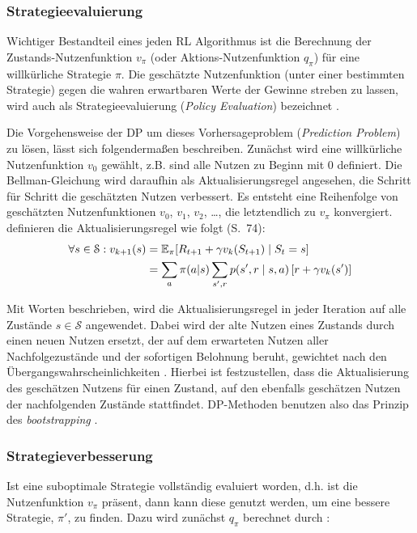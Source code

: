 \subsubsection{Strategieevaluierung}\label{sec:evaluierung}
Wichtiger Bestandteil eines jeden RL Algorithmus ist die Berechnung der Zustands-Nutzenfunktion $v_\pi$ (oder Aktions-Nutzenfunktion $q_\pi$) für eine willkürliche Strategie $\pi$. Die geschätzte Nutzenfunktion (unter einer bestimmten Strategie) gegen die wahren erwartbaren Werte der Gewinne streben zu lassen, wird auch als Strategieevaluierung (\textit{Policy Evaluation}) bezeichnet \cite[S.~74]{Sutton1998}.
\par 
Die Vorgehensweise der DP um dieses Vorhersageproblem (\textit{Prediction Problem}) zu lösen, lässt sich folgendermaßen beschreiben. Zunächst wird eine willkürliche Nutzenfunktion $v_0$ gewählt, z.B. sind alle Nutzen zu Beginn mit 0 definiert. Die Bellman-Gleichung wird daraufhin als Aktualisierungsregel angesehen, die Schritt für Schritt die geschätzten Nutzen verbessert. Es entsteht eine Reihenfolge von geschätzten Nutzenfunktionen $v_0$, $v_1$, $v_2$, \dots, die letztendlich zu $v_\pi$ konvergiert. \cite{Sutton1998} definieren die Aktualisierungsregel wie folgt (S.~74):
\begin{equation}\label{eq:fullbackup}
    \begin{aligned}
        \forall s \in \mathcal{S}: v_{k+1}(s) &= \operatorname{\mathbb{E}}_{\pi}[ R_{t+1} + \gamma v_k(S_{t+1}) \mid S_t = s] \\
        &= \sum_a{\pi(a|s) \sum_{s',r}p(s',r\mid s, a) \left[r+\gamma v_k(s')\right]}
    \end{aligned}
\end{equation}

Mit Worten beschrieben, wird die Aktualisierungsregel in jeder Iteration auf alle Zustände $s \in \mathcal{S}$ angewendet. Dabei wird der alte Nutzen eines Zustands durch einen neuen Nutzen ersetzt, der auf dem erwarteten Nutzen aller Nachfolgezustände und der sofortigen Belohnung beruht, gewichtet nach den Übergangswahrscheinlichkeiten \cite[S.~20]{Wiering}. Hierbei ist festzustellen, dass die  Aktualisierung des geschätzen Nutzens für einen Zustand, auf den ebenfalls geschätzen Nutzen der nachfolgenden Zustände stattfindet. DP-Methoden benutzen also das Prinzip des \textit{bootstrapping} \cite[S.~89]{Sutton1998}.

\subsubsection{Strategieverbesserung}
Ist eine suboptimale Strategie vollständig evaluiert worden, d.h. ist die Nutzenfunktion $v_\pi$ präsent, dann kann diese genutzt werden, um eine bessere Strategie, $\pi'$, zu finden. Dazu wird zunächst $q_\pi$ berechnet durch \cite[S.~21]{Wiering}:

